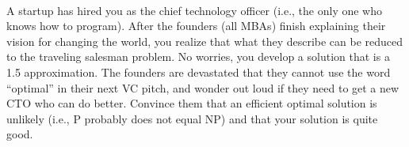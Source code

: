 \documentclass[12pt]{article}
\begin{document}
\renewcommand{\headrulewidth}{0.5pt}

\phantom{Test}
\\A startup has hired you as the chief technology officer (i.e., the only one who
knows how to program). After the founders (all MBAs) finish explaining their
vision for changing the world, you realize that what they describe can be
reduced to the traveling salesman problem. No worries, you develop a solution
that is a 1.5 approximation. The founders are devastated that they cannot use
the word ``optimal'' in their next VC pitch, and wonder out loud if they need
to get a new CTO who can do better. Convince them that an efficient optimal
solution is unlikely (i.e., P probably does not equal NP) and that your
solution is quite good. \\
\end{document}

